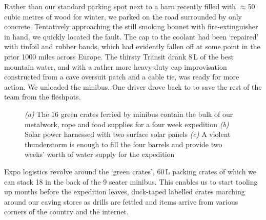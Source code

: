 Rather than our standard parking spot next to a barn recently filled with $\approx$50 cubic metres of wood for winter, we parked on the road surrounded by only concrete. Tentatively approaching the still smoking bonnet with fire-extinguisher in hand, we quickly located the fault. The cap to the coolant had been `repaired' with tinfoil and rubber bands, which had evidently fallen off at some point in the prior 1000 miles across Europe. The thirsty Transit drank 8\,L of the best mountain water, and with a rather more heavy-duty cap improvisation constructed from a cave oversuit patch and a cable tie, was ready for more action. We unloaded the minibus. One driver drove back to  to save the rest of the team from the fleshpots. 

\begin{figure}[t!]
\checkoddpage \ifoddpage \forcerectofloat \else \forceversofloat \fi
\centering
    \begin{subfigure}[t]{0.413\textwidth}
        \centering
        \caption{} \label{ben with crates}
    \end{subfigure}
        \hfill
\begin{subfigure}[t]{0.577\textwidth}
\centering
{}
 \caption{}\label{solar panels}
\end{subfigure}
\vfill
\begin{subfigure}[t]{\textwidth}
\centering
{}
 \caption{}\label{full barrel}
\end{subfigure}
  \caption{
    \emph{(a)} The 16 green crates ferried by minibus contain the bulk of our metalwork, rope and food supplies for a four week expedition 
     \emph{(b)}  Solar power harnessed with two surface solar panels 
     \emph{(c)}  A violent thunderstorm is enough to fill the four barrels and provide two weeks' worth of water supply for the expedition }
\end{figure}


Expo logistics revolve around the `green crates', 60\,L packing crates of which we can stack 18 in the back of the 9 seater minibus. This enables us to start tooling up months before the expedition leaves, duck-taped labelled crates marching around our caving stores as drills are fettled and items arrive from various corners of the country and the internet. 

